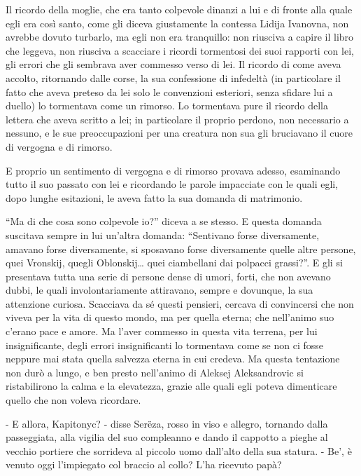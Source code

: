 Il ricordo della moglie, che era tanto colpevole dinanzi a lui e di fronte alla quale egli era così santo, come gli diceva giustamente la contessa Lidija Ivanovna, non avrebbe dovuto turbarlo, ma egli non era tranquillo: non riusciva a capire il libro che leggeva, non riusciva a scacciare i ricordi tormentosi dei suoi rapporti con lei, gli errori che gli sembrava aver commesso verso di lei. Il ricordo di come aveva accolto, ritornando dalle corse, la sua confessione di infedeltà (in particolare il fatto che aveva preteso da lei solo le convenzioni esteriori, senza sfidare lui a duello) lo tormentava come un rimorso. Lo tormentava pure il ricordo della lettera che aveva scritto a lei; in particolare il proprio perdono, non necessario a nessuno, e le sue preoccupazioni per una creatura non sua gli bruciavano il cuore di vergogna e di rimorso. 

E proprio un sentimento di vergogna e di rimorso provava adesso, esaminando tutto il suo passato con lei e ricordando le parole impacciate con le quali egli, dopo lunghe esitazioni, le aveva fatto la sua domanda di matrimonio. 

``Ma di che cosa sono colpevole io?'' diceva a se stesso. E questa domanda suscitava sempre in lui un'altra domanda: ``Sentivano forse diversamente, amavano forse diversamente, si sposavano forse diversamente quelle altre persone, quei Vronskij, quegli Oblonskij\ldots{} quei ciambellani dai polpacci grassi?''. E gli si presentava tutta una serie di persone dense di umori, forti, che non avevano dubbi, le quali involontariamente attiravano, sempre e dovunque, la sua attenzione curiosa. Scacciava da sé questi pensieri, cercava di convincersi che non viveva per la vita di questo mondo, ma per quella eterna; che nell'animo suo c'erano pace e amore. Ma l'aver commesso in questa vita terrena, per lui insignificante, degli errori insignificanti lo tormentava come se non ci fosse neppure mai stata quella salvezza eterna in cui credeva. Ma questa tentazione non durò a lungo, e ben presto nell'animo di Aleksej Aleksandrovic si ristabilirono la calma e la elevatezza, grazie alle quali egli poteva dimenticare quello che non voleva ricordare. 

\label{xxvi-3} 

- E allora, Kapitonyc? - disse Serëza, rosso in viso e allegro, tornando dalla passeggiata, alla vigilia del suo compleanno e dando il cappotto a pieghe al vecchio portiere che sorrideva al piccolo uomo dall'alto della sua statura. - Be', è venuto oggi l'impiegato col braccio al collo? L'ha ricevuto papà? 

